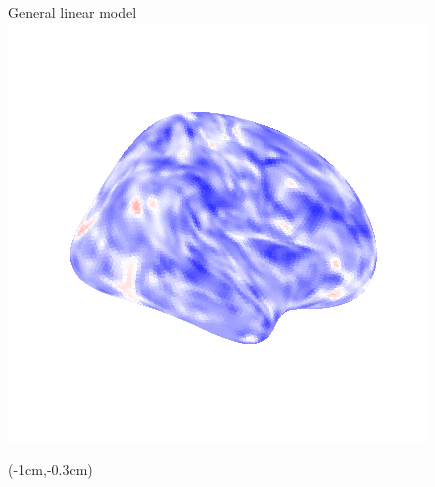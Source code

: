 \documentclass[bigger]{beamer}
\begin{document}
\begin{frame}{General linear model}
  \includegraphics[scale=0.20]{python/lr_button_9.png}
\end{frame}

\begin{frame}{}
  \begin{textblock*}{0cm}(-1cm,-0.3cm)
    \hspace*{-1cm}
\end{textblock*}
\end{frame}


\begin{frame}
  \tableofcontents
\end{frame}
\end{document}
